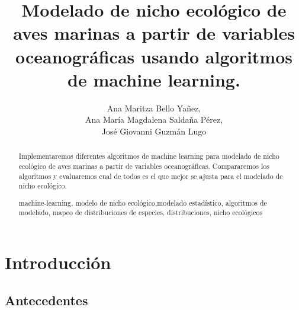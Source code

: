 \documentclass[runningheads,a4paper]{llncs}
\newcommand{\keywords}[1]{\par\addvspace\baselineskip
\noindent\keywordname\enspace\ignorespaces#1}
\begin{document}
\mainmatter  

\title{Modelado de nicho ecológico de aves marinas a partir de variables oceanográficas usando algoritmos de machine learning.}
\titlerunning{ }

\author{Ana Maritza Bello Yañez,\\
Ana María Magdalena Saldaña Pérez,\\
José Giovanni Guzmán Lugo}

\authorrunning{ }

\maketitle

\begin{abstract} Implementaremos diferentes algoritmos de machine learning para
modelado de nicho ecológico de aves marinas a partir de variables
oceanográficas. Compararemos los algoritmos y evaluaremos cual de todos es el
que mejor se ajusta para el modelado de nicho ecológico.
\keywords{machine-learning, modelo de nicho ecológico,modelado estadístico, 
algoritmos de modelado, mapeo de distribuciones de especies, distribuciones,
nicho ecológicos}
\end{abstract}


\section{Introducción}
\subsection{Antecedentes}
\end{document}

